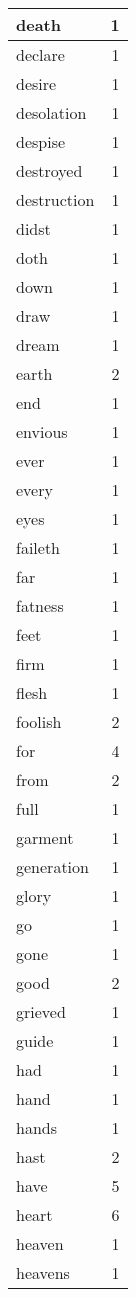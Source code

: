 \begin{center}
\begin{longtable}{l|r}
death & 1 \\ \hline
declare & 1 \\ \hline
desire & 1 \\ \hline
desolation & 1 \\ \hline
despise & 1 \\ \hline
destroyed & 1 \\ \hline
destruction & 1 \\ \hline
didst & 1 \\ \hline
doth & 1 \\ \hline
down & 1 \\ \hline
draw & 1 \\ \hline
dream & 1 \\ \hline
earth & 2 \\ \hline
end & 1 \\ \hline
envious & 1 \\ \hline
ever & 1 \\ \hline
every & 1 \\ \hline
eyes & 1 \\ \hline
faileth & 1 \\ \hline
far & 1 \\ \hline
fatness & 1 \\ \hline
feet & 1 \\ \hline
firm & 1 \\ \hline
flesh & 1 \\ \hline
foolish & 2 \\ \hline
for & 4 \\ \hline
from & 2 \\ \hline
full & 1 \\ \hline
garment & 1 \\ \hline
generation & 1 \\ \hline
glory & 1 \\ \hline
go & 1 \\ \hline
gone & 1 \\ \hline
good & 2 \\ \hline
grieved & 1 \\ \hline
guide & 1 \\ \hline
had & 1 \\ \hline
hand & 1 \\ \hline
hands & 1 \\ \hline
hast & 2 \\ \hline
have & 5 \\ \hline
heart & 6 \\ \hline
heaven & 1 \\ \hline
heavens & 1 \\ \hline

\end{longtable}
\end{center}
